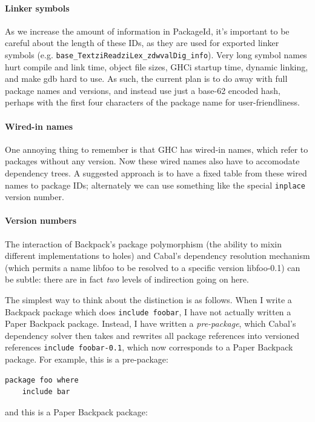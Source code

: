 \documentclass{article}
\begin{document}
\paragraph{Linker symbols} As we increase the amount of information in
PackageId, it's important to be careful about the length of these IDs,
as they are used for exported linker symbols (e.g.
\verb|base_TextziReadziLex_zdwvalDig_info|).  Very long symbol names
hurt compile and link time, object file sizes, GHCi startup time,
dynamic linking, and make gdb hard to use.  As such, the current plan is
to do away with full package names and versions, and instead use just a
base-62 encoded hash, perhaps with the first four characters of the package
name for user-friendliness.

\paragraph{Wired-in names} One annoying thing to remember is that GHC
has wired-in names, which refer to packages without any version.  Now
these wired names also have to accomodate dependency trees. A
suggested approach is to have a fixed table from these wired names to
package IDs; alternately we can use something like the special \verb|inplace|
version number.

\paragraph{Version numbers}  The interaction of Backpack's package polymorphism
(the ability to mixin different implementations to holes) and Cabal's dependency
resolution mechanism (which permits a name libfoo to be resolved to a specific
version libfoo-0.1) can be subtle: there are in fact \emph{two} levels of
indirection going on here.

The simplest way to think about the distinction is as follows.  When I write
a Backpack package which does \verb|include foobar|, I have not actually
written a Paper Backpack package.  Instead, I have written a \emph{pre-package},
which Cabal's dependency solver then takes and rewrites all package references
into versioned references \verb|include foobar-0.1|, which now corresponds to
a Paper Backpack package.  For example, this is a pre-package:

\begin{verbatim}
package foo where
    include bar
\end{verbatim}

and this is a Paper Backpack package:
\end{document}
